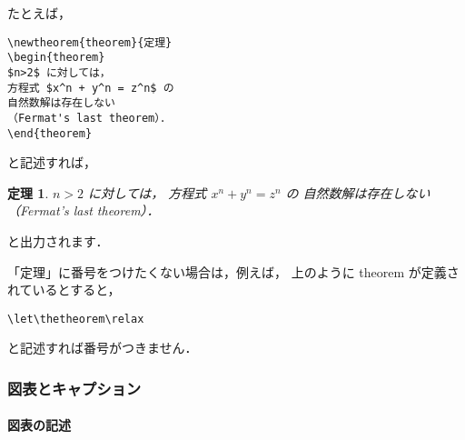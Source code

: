 \documentclass[paper]{jrsj}    %
\begin{document}
たとえば，
\begin{verbatim}
\newtheorem{theorem}{定理}
\begin{theorem}
$n>2$ に対しては，
方程式 $x^n + y^n = z^n$ の
自然数解は存在しない
（Fermat's last theorem）．
\end{theorem}
\end{verbatim}
と記述すれば，
\newtheorem{theorem}{定理}
\begin{theorem}
$n>2$ に対しては，
方程式 $x^n + y^n = z^n$ の
自然数解は存在しない
（Fermat's last theorem）．
\end{theorem}
と出力されます．

「定理」に番号をつけたくない場合は，例えば，
上のように theorem が定義されているとすると，
\begin{verbatim}
\let\thetheorem\relax
\end{verbatim}
と記述すれば番号がつきません．

\subsubsection{図表とキャプション}

\paragraph{図表の記述}
\end{document}
